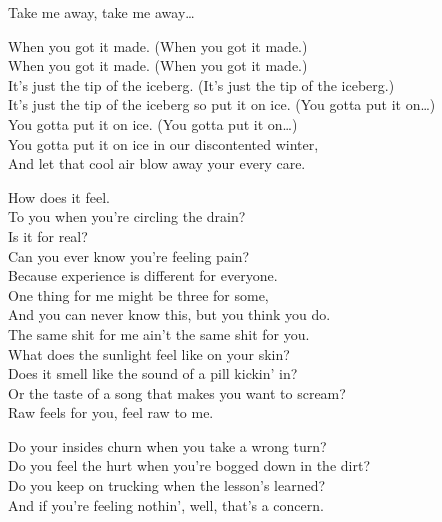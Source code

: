 Take me away, take me away… \\


When you got it made. (When you got it made.) \\
When you got it made. (When you got it made.) \\
It's just the tip of the iceberg. (It's just the tip of the iceberg.) \\
It's just the tip of the iceberg so put it on ice. (You gotta put it on…) \\
You gotta put it on ice. (You gotta put it on…) \\
You gotta put it on ice in our discontented winter, \\
And let that cool air blow away your every care. \\




How does it feel. \\
To you when you're circling the drain? \\
Is it for real? \\
Can you ever know you're feeling pain? \\
Because experience is different for everyone. \\
One thing for me might be three for some, \\
And you can never know this, but you think you do. \\
The same shit for me ain't the same shit for you. \\

What does the sunlight feel like on your skin? \\
Does it smell like the sound of a pill kickin' in? \\
Or the taste of a song that makes you want to scream? \\
Raw feels for you, feel raw to me. \\


Do your insides churn when you take a wrong turn? \\
Do you feel the hurt when you're bogged down in the dirt? \\
Do you keep on trucking when the lesson's learned? \\
And if you're feeling nothin', well, that's a concern. \\

